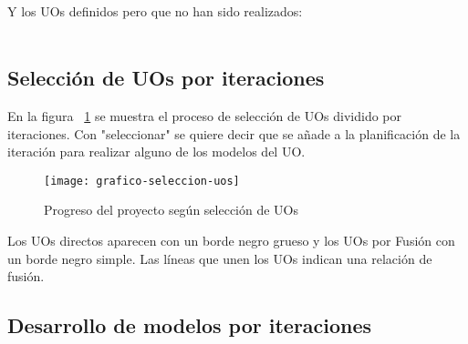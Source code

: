 \noindent
{}\\

Y los UOs definidos pero que no han sido realizados:\\

\noindent
{}\\

\subsection{Selección de UOs por iteraciones}
\label{dgp:uos-iteraciones-creacion}

En la figura ~\ref{fig:grafico-seleccion-uos} se muestra el proceso de selección de UOs dividido por iteraciones. Con "seleccionar" se quiere decir que se añade a la planificación de la iteración para realizar alguno de los modelos del UO.

\begin{figure}[!htbp]
	\texttt{[image: grafico-seleccion-uos]}
	\caption{Progreso del proyecto según selección de UOs}
	\label{fig:grafico-seleccion-uos}
\end{figure}

Los UOs directos aparecen con un borde negro grueso y los UOs por Fusión con un borde negro simple. Las líneas que unen los UOs indican una relación de fusión.\\

\subsection{Desarrollo de modelos por iteraciones}
\label{dgp:desarrollo-actividades}

